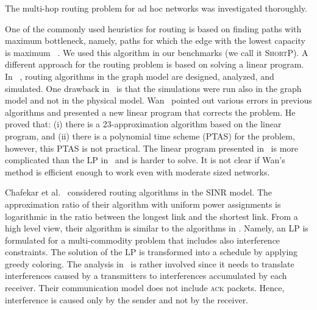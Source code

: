 \documentclass[12pt,oneside,english,a4paper]{book}
\theoremstyle{plain}
\theoremstyle{definition}
\theoremstyle{Theorem}
\theoremstyle{plain}
\newenvironment{proof sketch}[1]{\noindent {\emph{Proof sketch of #1:}}}{\hfill \qed}
\newcommand{\algB}{\textsc{ShortP}}
\newcommand{\algS}{\algB}
\begin{document}
The multi-hop routing problem for ad hoc networks was investigated
thoroughly.

One of the commonly used heuristics for routing is based on finding
paths with maximum bottleneck, namely, paths for which the edge with
the lowest capacity is maximum ~\cite{draves2004routing}.  We used
this algorithm in our benchmarks (we call it \algS). A different
approach for the routing problem is based on solving a linear program.
In ~\cite{kumar2005algorithmic,jain2005impact,alicherry2005joint11},
routing algorithms in the graph model are designed, analyzed, and
simulated.  One drawback
in~\cite{kumar2005algorithmic,jain2005impact,alicherry2005joint11} is
that the simulations were run also in the graph model and not in the
physical model.  Wan~\cite{wan2009multiflows} pointed out various
errors in previous algorithms and presented a new linear program that
corrects the problem. He proved that: (i) there is a
$23$-approximation algorithm based on the linear program, and (ii)
there is a polynomial time scheme (PTAS) for the problem, however,
this PTAS is not practical.  The linear program presented
in~\cite{wan2009multiflows} is more complicated than the LP
in~\cite{kumar2005algorithmic,alicherry2005joint11,buragohain2007improved}
and is harder to solve. It is not clear if Wan's method is efficient
enough to work even with moderate sized networks.

Chafekar et al.~\cite{ChafekarCapacity,chafekarPhD} considered routing
algorithms in the SINR model. The approximation ratio of their
algorithm with uniform power assignments is logarithmic in the ratio
between the longest link and the shortest link. From a high level
view, their algorithm is similar to the algorithms in
\cite{kumar2005algorithmic,alicherry2005joint11,buragohain2007improved}.
Namely, an LP is formulated for a multi-commodity problem that
includes also interference constraints. The solution of the LP is
transformed into a schedule by applying greedy coloring. The analysis
in~\cite{ChafekarCapacity} is rather involved since it needs to
translate interferences caused by a transmitters to interferences
accumulated by each receiver.
Their communication model does not include \textsc{ack} packets.
Hence, interference is caused only by the sender and not by the
receiver.
\end{document}
